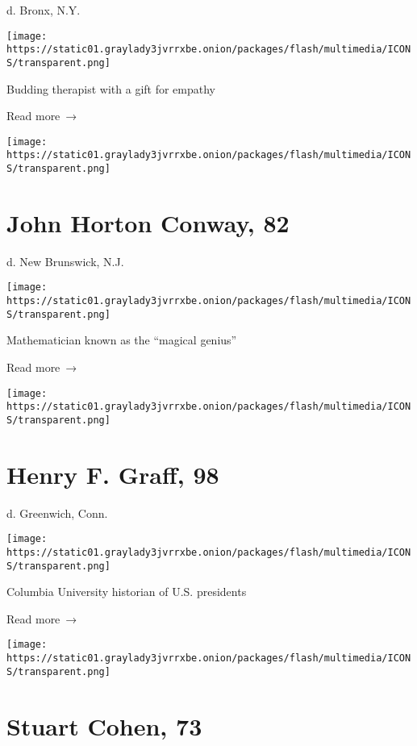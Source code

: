 d. Bronx, N.Y.

\texttt{[image: https://static01.graylady3jvrrxbe.onion/packages/flash/multimedia/ICONS/transparent.png]}

Budding therapist with a gift for empathy

 Read more~→

\href{https://www.nytimes3xbfgragh.onion/2020/04/15/technology/john-horton-conway-dead-coronavirus.html}{}

\texttt{[image: https://static01.graylady3jvrrxbe.onion/packages/flash/multimedia/ICONS/transparent.png]}

\hypertarget{john-horton-conway-82}{%
\section{John Horton Conway, 82}\label{john-horton-conway-82}}

d. New Brunswick, N.J.

\texttt{[image: https://static01.graylady3jvrrxbe.onion/packages/flash/multimedia/ICONS/transparent.png]}

Mathematician known as the ``magical genius''

 Read more~→

\href{https://www.nytimes3xbfgragh.onion/2020/04/15/books/henry-f-graff-columbia-historian-of-presidents-dies-at-98.html}{}

\texttt{[image: https://static01.graylady3jvrrxbe.onion/packages/flash/multimedia/ICONS/transparent.png]}

\hypertarget{henry-f-graff-98}{%
\section{Henry F. Graff, 98}\label{henry-f-graff-98}}

d. Greenwich, Conn.

\texttt{[image: https://static01.graylady3jvrrxbe.onion/packages/flash/multimedia/ICONS/transparent.png]}

Columbia University historian of U.S. presidents

 Read more~→

\href{https://www.nytimes3xbfgragh.onion/2020/04/15/nyregion/stuart-cohen-dead-coronavirus.html}{}

\texttt{[image: https://static01.graylady3jvrrxbe.onion/packages/flash/multimedia/ICONS/transparent.png]}

\hypertarget{stuart-cohen-73}{%
\section{Stuart Cohen, 73}\label{stuart-cohen-73}}

